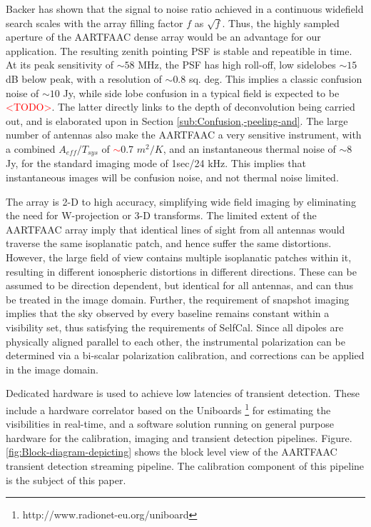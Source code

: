 \documentclass{aa}
\begin{document}
Backer \citep{backer1999pers} has shown that the signal to noise ratio
achieved in a continuous widefield search scales with the array filling
factor $f$ as $\sqrt{f}$. Thus, the highly sampled aperture of the
AARTFAAC dense array would be an advantage for our application. The
resulting zenith pointing PSF is stable and repeatible in time. At
its peak sensitivity of $\sim$$58$ MHz, the PSF has high roll-off,
low sidelobes $\sim$$15$ dB below peak, with a resolution of $\sim$$0.8$
sq. deg. This implies a classic confusion noise of $\sim$$10$ Jy,
while side	lobe confusion in a typical field is expected to be \textcolor{red}{<TODO>}.
The latter directly links to the depth of deconvolution being carried
out, and is elaborated upon in Section \ref{sub:Confusion,-peeling-and}.
The large number of antennas also make the AARTFAAC a very sensitive
instrument, with a combined $A_{eff}/T_{sys}$ of \textcolor{red}{$\sim$}0.7
$m^{2}/K$\citep{wijnholds2011situ}, and an instantaneous thermal
noise of $\sim$8 Jy, for the standard imaging mode of 1sec/24 kHz.
This implies that instantaneous images will be confusion noise, and
not thermal noise limited.

The array is 2-D to high accuracy, simplifying wide field imaging
by eliminating the need for W-projection or 3-D transforms. The limited
extent of the AARTFAAC array imply that identical lines of sight from
all antennas would traverse the same isoplanatic patch, and hence
suffer the same distortions. However, the large field of view contains
multiple isoplanatic patches within it, resulting in different ionospheric
distortions in different directions. These can be assumed to be direction
dependent, but identical for all antennas, and can thus be treated
in the image domain. Further, the requirement of snapshot imaging
implies that the sky observed by every baseline remains constant within
a visibility set, thus satisfying the requirements of SelfCal. Since
all dipoles are physically aligned parallel to each other, the instrumental
polarization can be determined via a bi-scalar polarization calibration,
and corrections can be applied in the image domain.

Dedicated hardware is used to achieve low latencies of transient detection.
These include a hardware correlator based on the Uniboards%
\footnote{http://www.radionet-eu.org/uniboard%
} for estimating the visibilities in real-time, and a software solution
running on general purpose hardware for the calibration, imaging and
transient detection pipelines. Figure. \ref{fig:Block-diagram-depicting}
shows the block level view of the AARTFAAC transient detection streaming
pipeline. The calibration component of this pipeline is the subject
of this paper.
\end{document}
